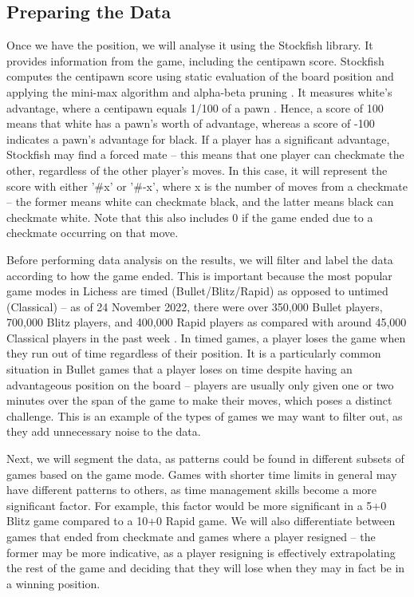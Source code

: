 \documentclass[%
 superscriptaddress,
showpacs,preprintnumbers,
 amsmath,
 amssymb,
 aps,
 pra,
showkeys,
onecolumn,
notitlepage,
11pt,
tightenlines      %
]{revtex4-1}
\begin{document}
\subsection{Preparing the Data}
Once we have the position, we will analyse it using the Stockfish library. It provides information from the game, including the centipawn score. Stockfish computes the centipawn score using static evaluation of the board position and applying the mini-max algorithm and alpha-beta pruning \cite{maharaj2022chess}. It measures white's advantage, where a centipawn equals 1/100 of a pawn \cite{centipawnDefinition}. Hence, a score of 100 means that white has a pawn's worth of advantage, whereas a score of -100 indicates a pawn's advantage for black. If a player has a significant advantage, Stockfish may find a forced mate -- this means that one player can checkmate the other, regardless of the other player's moves. In this case, it will represent the score with either '\#{x}' or '\#{-x}', where x is the number of moves from a checkmate -- the former means white can checkmate black, and the latter means black can checkmate white. Note that this also includes 0 if the game ended due to a checkmate occurring on that move.

Before performing data analysis on the results, we will filter and label the data according to how the game ended. This is important because the most popular game modes in Lichess are timed (Bullet/Blitz/Rapid) as opposed to untimed (Classical) -- as of 24 November 2022, there were over 350,000 Bullet players, 700,000 Blitz players, and 400,000 Rapid players as compared with around 45,000 Classical players in the past week \cite{lichessBlitzRatingDistribution}. In timed games, a player loses the game when they run out of time regardless of their position. It is a particularly common situation in Bullet games that a player loses on time despite having an advantageous position on the board -- players are usually only given one or two minutes over the span of the game to make their moves, which poses a distinct challenge. This is an example of the types of games we may want to filter out, as they add unnecessary noise to the data.

Next, we will segment the data, as patterns could be found in different subsets of games based on the game mode. Games with shorter time limits in general may have different patterns to others, as time management skills become a more significant factor. For example, this factor would be more significant in a 5+0 Blitz game compared to a 10+0 Rapid game. We will also differentiate between games that ended from checkmate and games where a player resigned -- the former may be more indicative, as a player resigning is effectively extrapolating the rest of the game and deciding that they will lose when they may in fact be in a winning position.
\end{document}
